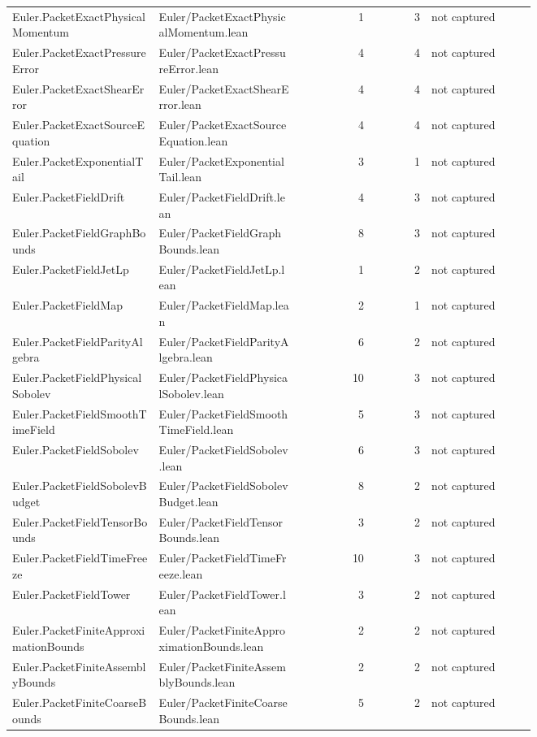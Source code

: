\documentclass[10pt]{article}
\begin{document}
\begin{longtable}{p{0.28\linewidth}p{0.27\linewidth}r r p{0.20\linewidth}}
Euler.PacketExactPhysicalMomentum & Euler/PacketExactPhysicalMomentum.lean & 1 & 3 & not captured\\
Euler.PacketExactPressureError & Euler/PacketExactPressureError.lean & 4 & 4 & not captured\\
Euler.PacketExactShearError & Euler/PacketExactShearError.lean & 4 & 4 & not captured\\
Euler.PacketExactSourceEquation & Euler/PacketExactSourceEquation.lean & 4 & 4 & not captured\\
Euler.PacketExponentialTail & Euler/PacketExponentialTail.lean & 3 & 1 & not captured\\
Euler.PacketFieldDrift & Euler/PacketFieldDrift.lean & 4 & 3 & not captured\\
Euler.PacketFieldGraphBounds & Euler/PacketFieldGraphBounds.lean & 8 & 3 & not captured\\
Euler.PacketFieldJetLp & Euler/PacketFieldJetLp.lean & 1 & 2 & not captured\\
Euler.PacketFieldMap & Euler/PacketFieldMap.lean & 2 & 1 & not captured\\
Euler.PacketFieldParityAlgebra & Euler/PacketFieldParityAlgebra.lean & 6 & 2 & not captured\\
Euler.PacketFieldPhysicalSobolev & Euler/PacketFieldPhysicalSobolev.lean & 10 & 3 & not captured\\
Euler.PacketFieldSmoothTimeField & Euler/PacketFieldSmoothTimeField.lean & 5 & 3 & not captured\\
Euler.PacketFieldSobolev & Euler/PacketFieldSobolev.lean & 6 & 3 & not captured\\
Euler.PacketFieldSobolevBudget & Euler/PacketFieldSobolevBudget.lean & 8 & 2 & not captured\\
Euler.PacketFieldTensorBounds & Euler/PacketFieldTensorBounds.lean & 3 & 2 & not captured\\
Euler.PacketFieldTimeFreeze & Euler/PacketFieldTimeFreeze.lean & 10 & 3 & not captured\\
Euler.PacketFieldTower & Euler/PacketFieldTower.lean & 3 & 2 & not captured\\
Euler.PacketFiniteApproximationBounds & Euler/PacketFiniteApproximationBounds.lean & 2 & 2 & not captured\\
Euler.PacketFiniteAssemblyBounds & Euler/PacketFiniteAssemblyBounds.lean & 2 & 2 & not captured\\
Euler.PacketFiniteCoarseBounds & Euler/PacketFiniteCoarseBounds.lean & 5 & 2 & not captured\\

\end{longtable}
\end{document}
